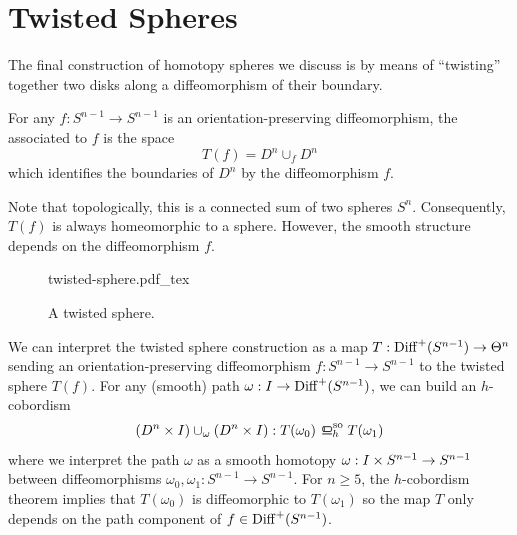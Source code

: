 \pagebreak
\section{Twisted Spheres}\label{sec:twisted-spheres}
The final construction of homotopy spheres we discuss is by means of ``twisting'' together two disks along a diffeomorphism of their boundary.

\begin{definition}
	For any $f : S^{n-1}\to S^{n-1}$ is an orientation-preserving diffeomorphism, the  associated to $f$ is the space
	\[
		T(f) = D^n\cup_f D^n
	\]
	which identifies the boundaries of $D^n$ by the diffeomorphism $f$.
\end{definition}

Note that topologically, this is a connected sum of two spheres $S^n$. Consequently, $T(f)$ is always homeomorphic to a sphere. However, the smooth structure depends on the diffeomorphism $f$.

\begin{figure}[ht]
	\centering
	{twisted-sphere.pdf_tex}
	\caption{A twisted sphere.}
\end{figure}

We can interpret the twisted sphere construction as a map $T: \Diff^+(S^{n-1})\to \Theta^n$ sending an orientation-preserving diffeomorphism $f : S^{n-1} \to S^{n-1}$ to the twisted sphere $T(f)$. For any (smooth) path $\omega : I \to \Diff^+(S^{n-1})$, we can build an $h$-cobordism 
	\[ (D^n\times I)\cup_\omega (D^n\times I) : T(\omega_0) \sohbord T(\omega_1)\]
	where we interpret the path $\omega$ as a smooth homotopy $\omega : I\times S^{n-1}\to\S^{n-1}$ between diffeomorphisms $\omega_0, \omega_1 : S^{n-1} \to S^{n-1}$. For $n\geq 5$, the $h$-cobordism theorem implies that $T(\omega_0)$ is diffeomorphic to $T(\omega_1)$ so the map $T$ only depends on the path component of $f\in \Diff^+(S^{n-1})$.

